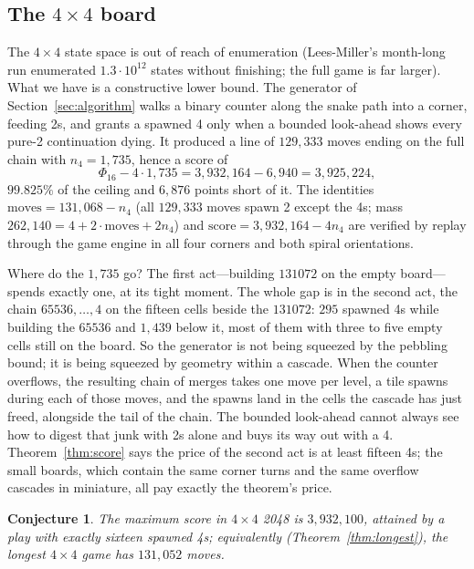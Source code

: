 \documentclass[11pt]{article}
\newtheorem{conjecture}[theorem]{Conjecture}
\theoremstyle{definition}
\theoremstyle{remark}
\newcommand{\nfour}{n_4}
\begin{document}
\subsection{The \texorpdfstring{$4\times4$}{4x4} board}\label{sec:fourbyfour}

The $4\times4$ state space is out of reach of enumeration (Lees-Miller's
month-long run \cite{leesmiller2017b} enumerated $1.3\cdot10^{12}$ states
without finishing; the full game is far larger). What we have is a
constructive lower bound. The generator of Section~\ref{sec:algorithm}
walks a binary counter along the snake path into a corner, feeding 2s,
and grants a spawned 4 only when a bounded look-ahead shows every pure-2
continuation dying. It produced a line of $129{,}333$ moves ending on the
full chain with $\nfour=1{,}735$, hence a score of
\[
\Phi_{16}-4\cdot1{,}735=3{,}932{,}164-6{,}940=3{,}925{,}224,
\]
$99.825\%$ of the ceiling and $6{,}876$ points short of it. The identities
$\text{moves}=131{,}068-\nfour$ (all $129{,}333$ moves spawn 2 except the
4s; mass $262{,}140=4+2\cdot\text{moves}+2\nfour$) and
$\text{score}=3{,}932{,}164-4\nfour$ are verified by replay through the
game engine in all four corners and both spiral orientations.

Where do the $1{,}735$ go? The first act---building $131072$ on the
empty board---spends exactly one, at its tight moment. The whole gap is in
the second act, the chain $65536,\dots,4$ on the fifteen cells beside the
$131072$: $295$ spawned 4s while building the $65536$ and $1{,}439$ below
it, most of them with three to five empty cells still on the board. So the
generator is not being squeezed by the pebbling bound; it is being squeezed
by geometry within a cascade. When the counter overflows, the resulting
chain of merges takes one move per level, a tile spawns during each of
those moves, and the spawns land in the cells the cascade has just freed,
alongside the tail of the chain. The bounded look-ahead cannot always see
how to digest that junk with 2s alone and buys its way out with a 4.
Theorem~\ref{thm:score} says the price of the second act is at least
fifteen 4s; the small boards, which contain the same corner turns and the
same overflow cascades in miniature, all pay exactly the theorem's price.

\begin{conjecture}\label{conj}
The maximum score in $4\times4$ 2048 is $3{,}932{,}100$, attained by a
play with exactly sixteen spawned 4s; equivalently
(Theorem~\ref{thm:longest}), the longest $4\times4$ game has
$131{,}052$ moves.
\end{conjecture}
\end{document}
